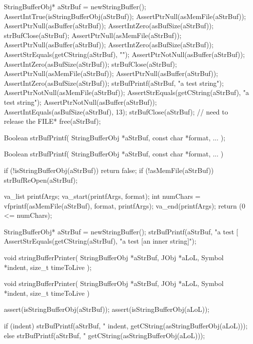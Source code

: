 
\startCTest
  StringBufferObj* aStrBuf = newStringBuffer();
  AssertIntTrue(isStringBufferObj(aStrBuf));
  AssertPtrNull(asMemFile(aStrBuf));
  AssertPtrNull(asBuffer(aStrBuf));
  AssertIntZero(asBufSize(aStrBuf));
  strBufClose(aStrBuf);
  AssertPtrNull(asMemFile(aStrBuf));
  AssertPtrNull(asBuffer(aStrBuf));
  AssertIntZero(asBufSize(aStrBuf));
  AssertStrEquals(getCString(aStrBuf), "");
  AssertPtrNotNull(asBuffer(aStrBuf));
  AssertIntZero(asBufSize(aStrBuf));
  strBufClose(aStrBuf);
  AssertPtrNull(asMemFile(aStrBuf));
  AssertPtrNull(asBuffer(aStrBuf));
  AssertIntZero(asBufSize(aStrBuf));
  strBufPrintf(aStrBuf, "a test string");
  AssertPtrNotNull(asMemFile(aStrBuf));
  AssertStrEquals(getCString(aStrBuf), "a test string");
  AssertPtrNotNull(asBuffer(aStrBuf));
  AssertIntEquals(asBufSize(aStrBuf), 13);
  strBufClose(aStrBuf); // need to release the FILE*
  free(aStrBuf);
\stopCTest
\stopTestCase
\stopTestSuite

\startTestSuite[strBufPrintf]

\startCHeader
Boolean strBufPrintf(
  StringBufferObj   *aStrBuf,
  const char        *format, 
  ...
);
\stopCHeader

\startCCode
Boolean strBufPrintf(
  StringBufferObj   *aStrBuf,
  const char        *format,
  ...
) {
  if (!isStringBufferObj(aStrBuf)) return false;
  if (!asMemFile(aStrBuf)) strBufReOpen(aStrBuf);
  
  va_list printfArgs;
  va_start(printfArgs, format);
  int numChars = vfprintf(asMemFile(aStrBuf), format, printfArgs);
  va_end(printfArgs);
  return (0 <= numChars);
}
\stopCCode

\startCTest
  StringBufferObj* aStrBuf = newStringBuffer();
  strBufPrintf(aStrBuf, "a test [%
  AssertStrEquals(getCString(aStrBuf), "a test [an inner string]");
\stopCTest
\stopTestCase
\stopTestSuite


\startCHeader
void stringBufferPrinter(
  StringBufferObj *aStrBuf,
  JObj            *aLoL,
  Symbol          *indent,
  size_t           timeToLive
);
\stopCHeader

\startCCode
void stringBufferPrinter(
  StringBufferObj *aStrBuf,
  JObj            *aLoL,
  Symbol          *indent,
  size_t           timeToLive
) {
  assert(isStringBufferObj(aStrBuf));
  assert(isStringBufferObj(aLoL));

  if (indent) {
    strBufPrintf(aStrBuf, "%
      indent,
      getCString(asStringBufferObj(aLoL)));
  } else {
    strBufPrintf(aStrBuf, "%
      getCString(asStringBufferObj(aLoL)));
  }
}
\stopCCode

